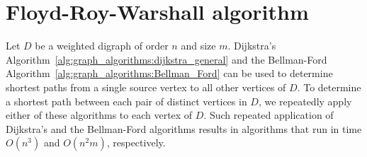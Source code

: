 


\section{Floyd-Roy-Warshall algorithm}

Let $D$ be a weighted digraph of order $n$ and size $m$.
Dijkstra's
Algorithm~\ref{alg:graph_algorithms:dijkstra_general} and the
Bellman-Ford
Algorithm~\ref{alg:graph_algorithms:Bellman_Ford} can be used to
determine shortest paths from a single source
vertex to all other vertices of $D$. To determine a shortest path
between each pair of distinct vertices in $D$, we repeatedly apply
either of these algorithms to each vertex of $D$. Such repeated
application of Dijkstra's and the Bellman-Ford algorithms results in
algorithms that run in time $O(n^3)$ and $O(n^2m)$, respectively.

